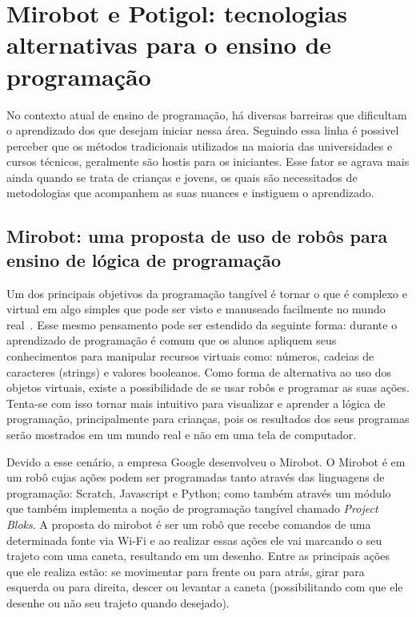 \chapter{Mirobot e Potigol: tecnologias alternativas para o ensino de programação}
\label{cap:referencial}

No contexto atual de ensino de programação, há diversas barreiras que dificultam o aprendizado dos que desejam iniciar nessa área. Seguindo essa linha é possivel perceber que os métodos tradicionais utilizados na maioria das universidades e cursos técnicos, geralmente são hostis para os iniciantes. Esse fator se agrava mais ainda quando se trata de crianças e jovens, os quais são necessitados de metodologias que acompanhem as suas nuances e instiguem o aprendizado.

\section{Mirobot: uma proposta de uso de robôs para ensino de lógica de
programação}
\label{sec:mirobot}

Um dos principais objetivos da programação tangível é tornar o que é complexo e
virtual em algo simples que pode ser visto e manuseado facilmente no mundo
real~\cite{Horn2008, Horn2007, McNerney2000}. Esse mesmo pensamento pode ser estendido da seguinte forma: durante o aprendizado de programação é comum que os alunos apliquem seus
conhecimentos para manipular recursos virtuais como: números, cadeias de
caracteres (strings) e valores booleanos. 
Como forma de alternativa ao uso dos
objetos virtuais, existe a possibilidade de se usar robôs e programar as suas
ações. 
Tenta-se com isso tornar mais intuitivo para visualizar e aprender a
lógica de programação, principalmente para crianças, pois os resultados dos
seus programas serão mostrados em um mundo real e não em uma tela de computador.

Devido a esse cenário, a empresa Google desenvolveu o Mirobot. O Mirobot é em um robô
cujas ações podem ser programadas tanto através das
linguagens de programação: Scratch, Javascript e Python; como também através um módulo que
também implementa a noção de programação tangível chamado \textit{Project Bloks}. 
A proposta do mirobot é ser um robô que recebe comandos de uma determinada fonte
via Wi-Fi e ao realizar essas ações ele vai marcando o seu trajeto com uma
caneta, resultando em um desenho.
Entre as principais ações que ele realiza
estão: se movimentar para frente ou para atrás, girar para esquerda ou para
direita, descer ou levantar a caneta (possibilitando com que ele desenhe ou não
seu trajeto quando desejado).


